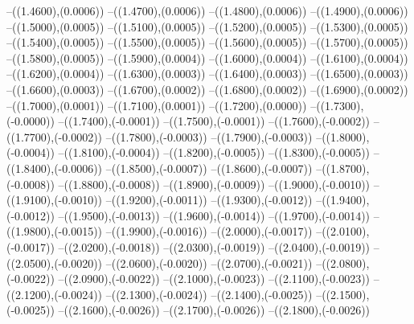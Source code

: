 {	--({\sx*(1.4600)},{\sy*(0.0006)})
	--({\sx*(1.4700)},{\sy*(0.0006)})
	--({\sx*(1.4800)},{\sy*(0.0006)})
	--({\sx*(1.4900)},{\sy*(0.0006)})
	--({\sx*(1.5000)},{\sy*(0.0005)})
	--({\sx*(1.5100)},{\sy*(0.0005)})
	--({\sx*(1.5200)},{\sy*(0.0005)})
	--({\sx*(1.5300)},{\sy*(0.0005)})
	--({\sx*(1.5400)},{\sy*(0.0005)})
	--({\sx*(1.5500)},{\sy*(0.0005)})
	--({\sx*(1.5600)},{\sy*(0.0005)})
	--({\sx*(1.5700)},{\sy*(0.0005)})
	--({\sx*(1.5800)},{\sy*(0.0005)})
	--({\sx*(1.5900)},{\sy*(0.0004)})
	--({\sx*(1.6000)},{\sy*(0.0004)})
	--({\sx*(1.6100)},{\sy*(0.0004)})
	--({\sx*(1.6200)},{\sy*(0.0004)})
	--({\sx*(1.6300)},{\sy*(0.0003)})
	--({\sx*(1.6400)},{\sy*(0.0003)})
	--({\sx*(1.6500)},{\sy*(0.0003)})
	--({\sx*(1.6600)},{\sy*(0.0003)})
	--({\sx*(1.6700)},{\sy*(0.0002)})
	--({\sx*(1.6800)},{\sy*(0.0002)})
	--({\sx*(1.6900)},{\sy*(0.0002)})
	--({\sx*(1.7000)},{\sy*(0.0001)})
	--({\sx*(1.7100)},{\sy*(0.0001)})
	--({\sx*(1.7200)},{\sy*(0.0000)})
	--({\sx*(1.7300)},{\sy*(-0.0000)})
	--({\sx*(1.7400)},{\sy*(-0.0001)})
	--({\sx*(1.7500)},{\sy*(-0.0001)})
	--({\sx*(1.7600)},{\sy*(-0.0002)})
	--({\sx*(1.7700)},{\sy*(-0.0002)})
	--({\sx*(1.7800)},{\sy*(-0.0003)})
	--({\sx*(1.7900)},{\sy*(-0.0003)})
	--({\sx*(1.8000)},{\sy*(-0.0004)})
	--({\sx*(1.8100)},{\sy*(-0.0004)})
	--({\sx*(1.8200)},{\sy*(-0.0005)})
	--({\sx*(1.8300)},{\sy*(-0.0005)})
	--({\sx*(1.8400)},{\sy*(-0.0006)})
	--({\sx*(1.8500)},{\sy*(-0.0007)})
	--({\sx*(1.8600)},{\sy*(-0.0007)})
	--({\sx*(1.8700)},{\sy*(-0.0008)})
	--({\sx*(1.8800)},{\sy*(-0.0008)})
	--({\sx*(1.8900)},{\sy*(-0.0009)})
	--({\sx*(1.9000)},{\sy*(-0.0010)})
	--({\sx*(1.9100)},{\sy*(-0.0010)})
	--({\sx*(1.9200)},{\sy*(-0.0011)})
	--({\sx*(1.9300)},{\sy*(-0.0012)})
	--({\sx*(1.9400)},{\sy*(-0.0012)})
	--({\sx*(1.9500)},{\sy*(-0.0013)})
	--({\sx*(1.9600)},{\sy*(-0.0014)})
	--({\sx*(1.9700)},{\sy*(-0.0014)})
	--({\sx*(1.9800)},{\sy*(-0.0015)})
	--({\sx*(1.9900)},{\sy*(-0.0016)})
	--({\sx*(2.0000)},{\sy*(-0.0017)})
	--({\sx*(2.0100)},{\sy*(-0.0017)})
	--({\sx*(2.0200)},{\sy*(-0.0018)})
	--({\sx*(2.0300)},{\sy*(-0.0019)})
	--({\sx*(2.0400)},{\sy*(-0.0019)})
	--({\sx*(2.0500)},{\sy*(-0.0020)})
	--({\sx*(2.0600)},{\sy*(-0.0020)})
	--({\sx*(2.0700)},{\sy*(-0.0021)})
	--({\sx*(2.0800)},{\sy*(-0.0022)})
	--({\sx*(2.0900)},{\sy*(-0.0022)})
	--({\sx*(2.1000)},{\sy*(-0.0023)})
	--({\sx*(2.1100)},{\sy*(-0.0023)})
	--({\sx*(2.1200)},{\sy*(-0.0024)})
	--({\sx*(2.1300)},{\sy*(-0.0024)})
	--({\sx*(2.1400)},{\sy*(-0.0025)})
	--({\sx*(2.1500)},{\sy*(-0.0025)})
	--({\sx*(2.1600)},{\sy*(-0.0026)})
	--({\sx*(2.1700)},{\sy*(-0.0026)})
	--({\sx*(2.1800)},{\sy*(-0.0026)})
}
